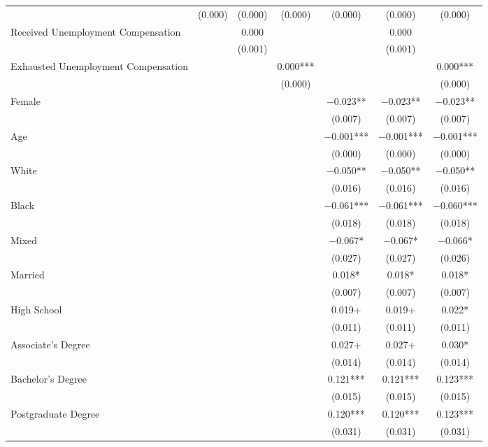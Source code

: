 \documentclass[
]{article}
\begin{document}
\begin{table}
{\begin{tabular}[t]{lcccccc}
 & (\num{0.000}) & (\num{0.000}) & (\num{0.000}) & (\num{0.000}) & (\num{0.000}) & (\num{0.000})\\
Received
Unemployment
Compensation &  & \num{0.000} &  &  & \num{0.000} & \\
 &  & (\num{0.001}) &  &  & (\num{0.001}) & \\
Exhausted
Unemployment
Compensation &  &  & \num{0.000}*** &  &  & \num{0.000}***\\
 &  &  & (\num{0.000}) &  &  & (\num{0.000})\\
Female &  &  &  & \num{-0.023}** & \num{-0.023}** & \num{-0.023}**\\
 &  &  &  & (\num{0.007}) & (\num{0.007}) & \vphantom{1} (\num{0.007})\\
Age &  &  &  & \num{-0.001}*** & \num{-0.001}*** & \num{-0.001}***\\
 &  &  &  & (\num{0.000}) & (\num{0.000}) & (\num{0.000})\\
White &  &  &  & \num{-0.050}** & \num{-0.050}** & \num{-0.050}**\\
 &  &  &  & (\num{0.016}) & (\num{0.016}) & (\num{0.016})\\
Black &  &  &  & \num{-0.061}*** & \num{-0.061}*** & \num{-0.060}***\\
 &  &  &  & (\num{0.018}) & (\num{0.018}) & (\num{0.018})\\
Mixed &  &  &  & \num{-0.067}* & \num{-0.067}* & \num{-0.066}*\\
 &  &  &  & (\num{0.027}) & (\num{0.027}) & (\num{0.026})\\
Married &  &  &  & \num{0.018}* & \num{0.018}* & \num{0.018}*\\
 &  &  &  & (\num{0.007}) & (\num{0.007}) & (\num{0.007})\\
High
School &  &  &  & \num{0.019}+ & \num{0.019}+ & \num{0.022}*\\
 &  &  &  & (\num{0.011}) & (\num{0.011}) & (\num{0.011})\\
Associate's
Degree &  &  &  & \num{0.027}+ & \num{0.027}+ & \num{0.030}*\\
 &  &  &  & (\num{0.014}) & (\num{0.014}) & (\num{0.014})\\
Bachelor's
Degree &  &  &  & \num{0.121}*** & \num{0.121}*** & \num{0.123}***\\
 &  &  &  & (\num{0.015}) & (\num{0.015}) & (\num{0.015})\\
Postgraduate
Degree &  &  &  & \num{0.120}*** & \num{0.120}*** & \num{0.123}***\\
 &  &  &  & (\num{0.031}) & (\num{0.031}) & (\num{0.031})\\

\end{tabular}}
\end{table}
\end{document}
